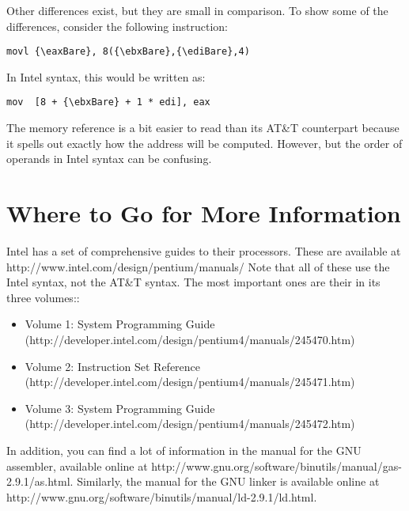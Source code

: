 Other differences exist, but they are small in comparison.  To show some
of the differences, consider the following instruction:

\begin{simpletyping}
\begin{lstlisting}
movl {\eaxBare}, 8({\ebxBare},{\ediBare},4)
\end{lstlisting}
\end{simpletyping}

In Intel syntax, this would be written as:

\begin{simpletyping}
\begin{lstlisting}
mov  [8 + {\ebxBare} + 1 * edi], eax
\end{lstlisting}
\end{simpletyping}

The memory reference is a bit easier to read than its AT\&T counterpart
because it spells out exactly how the address
will be computed.  However, but the order of operands in Intel syntax can be 
confusing.

\section{Where to Go for More Information}

Intel has a set of comprehensive guides to their processors.  These
are available at http://www.intel.com/design/pentium/manuals/  Note that
all of these use the Intel syntax, not the AT\&T syntax.  The most important
ones are their 
in its three volumes::

\begin{itemize}\item Volume 1: System Programming Guide (http://developer.intel.com/design/pentium4/manuals/245470.htm) 
\item Volume 2: Instruction Set Reference (http://developer.intel.com/design/pentium4/manuals/245471.htm) 
\item Volume 3: System Programming Guide (http://developer.intel.com/design/pentium4/manuals/245472.htm) 
\end{itemize}

In addition, you can find a lot of information in the manual for the GNU assembler, available online at http://www.gnu.org/software/binutils/manual/gas-2.9.1/as.html.  Similarly, the manual for the GNU linker is available online at http://www.gnu.org/software/binutils/manual/ld-2.9.1/ld.html.

